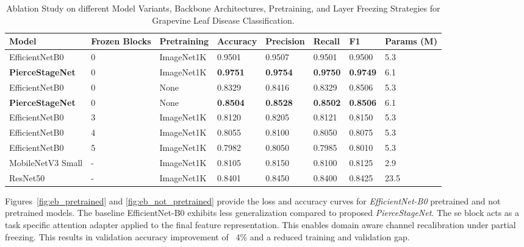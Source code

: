 \documentclass[conference]{IEEEtran}
\begin{document}
\begin{table}[t]
	\caption{Ablation Study on different Model Variants, Backbone Architectures, Pretraining, and Layer Freezing Strategies for Grapevine Leaf Disease Classification.}
	\centering
	\begin{tabular}{m{} m{} m{} m{} m{} m{} m{} m{}}
		\toprule
		\textbf{Model} & \textbf{Frozen Blocks} & \textbf{Pretraining} & \textbf{Accuracy} & \textbf{Precision} & \textbf{Recall} & \textbf{F1} & \textbf{Params (M)} \\
		\midrule
		EfficientNetB0          & 0 & ImageNet1K & 0.9501 & 0.9507 & 0.9501 & 0.9500 & 5.3 \\
		\textbf{PierceStageNet} & 0 & ImageNet1K & \textbf{0.9751} & \textbf{0.9754} & \textbf{0.9750} & \textbf{0.9749} & 6.1 \\
		EfficientNetB0          & 0 & None & 0.8329 & 0.8416 & 0.8329 & 0.8506 & 5.3 \\
		\textbf{PierceStageNet} & 0 & None & \textbf{0.8504} & \textbf{0.8528} & \textbf{0.8502} & \textbf{0.8506} & 6.1 \\
		EfficientNetB0          & 3 & ImageNet1K & 0.8120 & 0.8205 & 0.8121 & 0.8150 & 5.3 \\
		EfficientNetB0          & 4 & ImageNet1K & 0.8055 & 0.8100 & 0.8050 & 0.8075 & 5.3 \\
		EfficientNetB0          & 5 & ImageNet1K & 0.7982 & 0.8050 & 0.7985 & 0.8010 & 5.3 \\
		MobileNetV3 Small       & - & ImageNet1K & 0.8105 & 0.8150 & 0.8100 & 0.8125 & 2.9 \\
		ResNet50                & - & ImageNet1K & 0.8401 & 0.8450 & 0.8400 & 0.8425 & 23.5 \\
		\bottomrule
	\end{tabular}
	\label{tab:ablation}
\end{table}

Figures~\ref{fig:eb_pretrained} and \ref{fig:eb_not_pretrained} provide the loss and accuracy curves for \textit{EfficientNet-B0} pretrained and not pretrained models.
The baseline EfficientNet-B0 exhibits less generalization compared to proposed \textit{PierceStageNet}. The \ac{se} block acts as a task specific attention adapter applied to the final feature representation. This enables domain aware channel recalibration under partial freezing. This results in validation accuracy improvement of ~4\% and a reduced training and validation gap.
\end{document}
